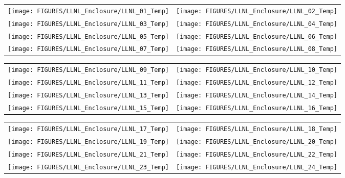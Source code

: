 \begin{figure}[p]
\begin{tabular*}{\textwidth}{l@{\extracolsep{\fill}}r}
\texttt{[image: FIGURES/LLNL\_Enclosure/LLNL\_01\_Temp]} &
\texttt{[image: FIGURES/LLNL\_Enclosure/LLNL\_02\_Temp]} \\
\texttt{[image: FIGURES/LLNL\_Enclosure/LLNL\_03\_Temp]} &
\texttt{[image: FIGURES/LLNL\_Enclosure/LLNL\_04\_Temp]} \\
\texttt{[image: FIGURES/LLNL\_Enclosure/LLNL\_05\_Temp]} &
\texttt{[image: FIGURES/LLNL\_Enclosure/LLNL\_06\_Temp]} \\
\texttt{[image: FIGURES/LLNL\_Enclosure/LLNL\_07\_Temp]} &
\texttt{[image: FIGURES/LLNL\_Enclosure/LLNL\_08\_Temp]}
\end{tabular*}
\label{LLNL_Enclosure_Temp_1}
\end{figure}

\begin{figure}[p]
\begin{tabular*}{\textwidth}{l@{\extracolsep{\fill}}r}
\texttt{[image: FIGURES/LLNL\_Enclosure/LLNL\_09\_Temp]} &
\texttt{[image: FIGURES/LLNL\_Enclosure/LLNL\_10\_Temp]} \\
\texttt{[image: FIGURES/LLNL\_Enclosure/LLNL\_11\_Temp]} &
\texttt{[image: FIGURES/LLNL\_Enclosure/LLNL\_12\_Temp]} \\
\texttt{[image: FIGURES/LLNL\_Enclosure/LLNL\_13\_Temp]} &
\texttt{[image: FIGURES/LLNL\_Enclosure/LLNL\_14\_Temp]} \\
 \texttt{[image: FIGURES/LLNL\_Enclosure/LLNL\_15\_Temp]} &
\texttt{[image: FIGURES/LLNL\_Enclosure/LLNL\_16\_Temp]}
\end{tabular*}
\label{LLNL_Enclosure_Temp_2}
\end{figure}

\begin{figure}[p]
\begin{tabular*}{\textwidth}{l@{\extracolsep{\fill}}r}
 \texttt{[image: FIGURES/LLNL\_Enclosure/LLNL\_17\_Temp]} &
 \texttt{[image: FIGURES/LLNL\_Enclosure/LLNL\_18\_Temp]} \\
\texttt{[image: FIGURES/LLNL\_Enclosure/LLNL\_19\_Temp]} &
 \texttt{[image: FIGURES/LLNL\_Enclosure/LLNL\_20\_Temp]} \\
\texttt{[image: FIGURES/LLNL\_Enclosure/LLNL\_21\_Temp]} &
\texttt{[image: FIGURES/LLNL\_Enclosure/LLNL\_22\_Temp]} \\
\texttt{[image: FIGURES/LLNL\_Enclosure/LLNL\_23\_Temp]} &
\texttt{[image: FIGURES/LLNL\_Enclosure/LLNL\_24\_Temp]}
\end{tabular*}
\label{LLNL_Enclosure_Temp_3}
\end{figure}

